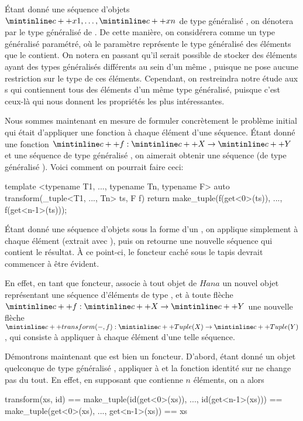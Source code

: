 Étant donné une séquence d'objets $\cc{x1}, \hdots, \cc{xn}$ de type généralisé
, on dénotera par  le type généralisé de .
De cette manière, on considérera  comme un type généralisé paramétré,
où le paramètre représente le type généralisé des éléments que le 
contient. On notera en passant qu'il serait possible de stocker des éléments
ayant des types généralisés différents au sein d'un même , puisque
 ne pose aucune restriction sur le type de ces éléments. Cependant,
on restreindra notre étude aux s qui contiennent tous des éléments
d'un même type généralisé, puisque c'est ceux-là qui nous donnent les propriétés
les plus intéressantes.

Nous sommes maintenant en mesure de formuler concrètement le problème initial
qui était d'appliquer une fonction à chaque élément d'une séquence. Étant
donné une fonction $\cc{f} : \cc{X} \to \cc{Y}$ et une séquence 
de type généralisé , on aimerait obtenir une séquence
 (de type généralisé ).
Voici comment on pourrait faire ceci:
\begin{cpp}
    template <typename T1, ..., typename Tn, typename F>
    auto transform(_tuple<T1, ..., Tn> ts, F f) {
        return make_tuple(f(get<0>(ts)), ..., f(get<n-1>(ts)));
    }
\end{cpp}

Étant donné une séquence d'objets sous la forme d'un , on
applique simplement  à chaque élément (extrait avec ),
puis on retourne une nouvelle séquence qui contient le résultat. À ce
point-ci, le foncteur caché sous le tapis devrait commencer à être évident.

En effet, en tant que foncteur,  associe à tout objet  de $Hana$
un nouvel objet  représentant une séquence d'éléments de type ,
et à toute flèche $\cc{f} : \cc{X} \to \cc{Y}$ une nouvelle flèche $\cc{transform(-, f)} :
\cc{Tuple(X)} \to \cc{Tuple(Y)}$, qui consiste à appliquer  à chaque
élément d'une telle séquence.

Démontrons maintenant que  est bien un foncteur. D'abord, étant
donné un objet quelconque  de type généralisé ,
appliquer  à  et la fonction identité sur 
ne change pas  du tout. En effet, en supposant que 
contienne $n$ éléments, on a alors
\begin{cpp}
    transform(xs, id) == make_tuple(id(get<0>(xs)), ..., id(get<n-1>(xs)))
                      == make_tuple(get<0>(xs), ..., get<n-1>(xs))
                      == xs
\end{cpp}

